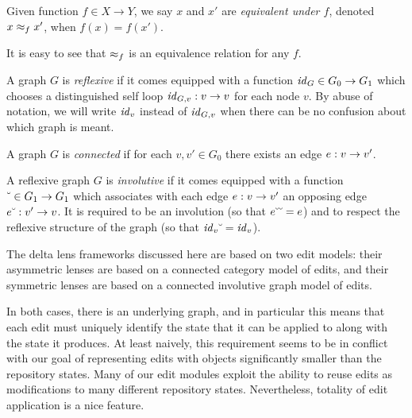 \begin{definition}
    Given function $f \in X \to Y$, we say $x$ and $x'$ are \emph{equivalent
    under $f$}, denoted $x \approx_f x'$, when $f(x)=f(x')$.
\end{definition}

It is easy to see that $\approx_f$ is an equivalence relation for any $f$.

\begin{definition}
    A graph $G$ is \emph{reflexive} if it comes equipped with a function
    $\mathit{id}_G \in G_0 \to G_1$ which chooses a distinguished self loop
    $\mathit{id}_{G,v} : v \to v$ for each node $v$. By abuse of notation, we
    will write $\mathit{id}_v$ instead of $\mathit{id}_{G,v}$ when there can be no confusion
    about which graph is meant.
\end{definition}

\begin{definition}
    A graph $G$ is \emph{connected} if for each $v,v'\in G_0$ there exists
    an edge $e : v \to v'$.
\end{definition}

\begin{definition}
    A reflexive graph $G$ is \emph{involutive} if it comes equipped with a
    function $\breve{\ } \in G_1 \to G_1$ which associates with each edge $e : v
    \to v'$ an opposing edge $e\breve{\ } : v' \to v$. It is required to
    be an involution (so that $e\breve{\ }\breve{\ } = e$) and to respect the
    reflexive structure of the graph (so that $\mathit{id}_v\breve{\ }=\mathit{id}_v$).
\end{definition}

The delta lens frameworks discussed here are based on two edit models: their
asymmetric lenses are based on a connected category model of edits, and
their symmetric lenses are based on a connected involutive graph model of
edits.

In both cases, there is an underlying graph, and in particular this means
that each edit must uniquely identify the state that it can be applied to
along with the state it produces. At least naively, this requirement seems
to be in conflict with our goal of representing edits with objects
significantly smaller than the repository states. Many of our edit modules
exploit the ability to reuse edits as modifications to many different
repository states. Nevertheless, totality of edit application is a nice
feature.

